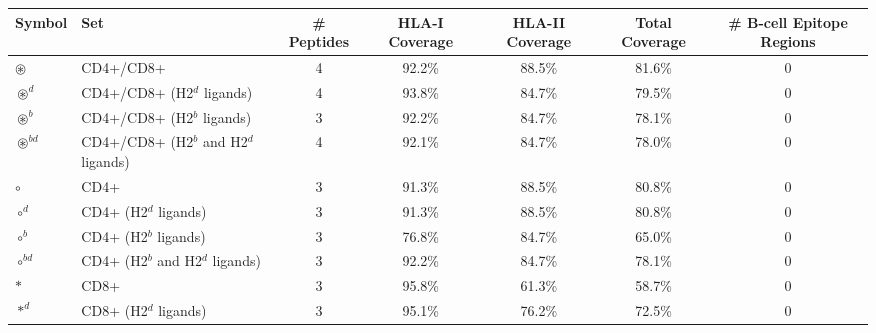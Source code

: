 \begin{tabular}{llccccc}
\toprule
                                              Symbol &                                      Set &  \# Peptides & HLA-I Coverage & HLA-II Coverage & Total Coverage &  \# B-cell Epitope Regions \\
\midrule
                                     $ \circledast $ &                                CD4+/CD8+ &            4 &         92.2\% &          88.5\% &         81.6\% &                          0 \\
                                   $ \circledast^d $ &               CD4+/CD8+ (H2$^d$ ligands) &            4 &         93.8\% &          84.7\% &         79.5\% &                          0 \\
                                   $ \circledast^b $ &               CD4+/CD8+ (H2$^b$ ligands) &            3 &         92.2\% &          84.7\% &         78.1\% &                          0 \\
                                $ \circledast^{bd} $ &    CD4+/CD8+ (H2$^b$ and H2$^d$ ligands) &            4 &         92.1\% &          84.7\% &         78.0\% &                          0 \\
                                           $ \circ $ &                                     CD4+ &            3 &         91.3\% &          88.5\% &         80.8\% &                          0 \\
                                         $ \circ^d $ &                    CD4+ (H2$^d$ ligands) &            3 &         91.3\% &          88.5\% &         80.8\% &                          0 \\
                                         $ \circ^b $ &                    CD4+ (H2$^b$ ligands) &            3 &         76.8\% &          84.7\% &         65.0\% &                          0 \\
                                      $ \circ^{bd} $ &         CD4+ (H2$^b$ and H2$^d$ ligands) &            3 &         92.2\% &          84.7\% &         78.1\% &                          0 \\
                                            $ \ast $ &                                     CD8+ &            3 &         95.8\% &          61.3\% &         58.7\% &                          0 \\
                                          $ \ast^d $ &                    CD8+ (H2$^d$ ligands) &            3 &         95.1\% &          76.2\% &         72.5\% &                          0 \\

\end{tabular}
